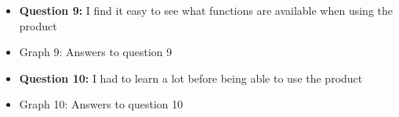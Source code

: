\documentclass{article}
\begin{document}
\begin{itemize}
		\item[] \textbf{Question 9:} I find it easy to see what functions are available when using the product
		\item[] \begin{minipage}[t]{\linewidth}
         	 \raggedright
          	\medskip
          	\centerline{Graph 9: Answers to question 9}
          \end{minipage}
\end{itemize}
\newpage
\begin{itemize}
		\item[] \textbf{Question 10:} I had to learn a lot before being able to use the product
		\item[] \begin{minipage}[t]{\linewidth}
         	 \raggedright
          	\medskip
          	\centerline{Graph 10: Answers to question 10}
          \end{minipage}
\end{itemize}
\end{document}
